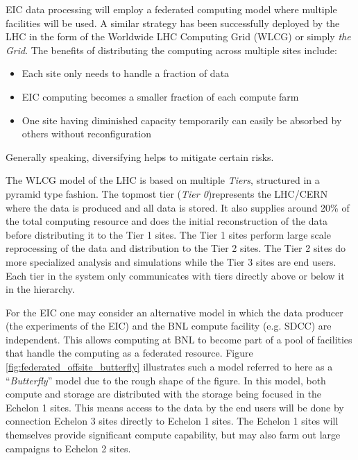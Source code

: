 EIC data processing will employ a federated computing model where multiple facilities will be used. A similar strategy has been successfully deployed by the LHC in the form of the Worldwide LHC Computing Grid (WLCG) or simply \emph{the Grid}\cite{SHIERS2007219}. The benefits of distributing the computing across multiple sites include:

\begin{itemize}
    \item Each site only needs to handle a fraction of data
    \item EIC computing becomes a smaller fraction of each compute farm
    \item One site having diminished capacity temporarily  can easily be absorbed by others without reconfiguration
\end{itemize}

Generally speaking, diversifying helps to mitigate certain risks. 

The WLCG model of the LHC is based on multiple \emph{Tiers}, structured in a pyramid type fashion. The topmost tier (\emph{Tier 0})represents the LHC/CERN where the data is produced and all data is stored. It also supplies around 20\% of the total computing resource and does the initial reconstruction of the data before distributing it to the Tier 1 sites\cite{WLCG_Tiers_website}. The Tier 1 sites perform large scale reprocessing of the data and distribution to the Tier 2 sites. The Tier 2 sites do more specialized analysis and simulations while the Tier 3 sites are end users. Each tier in the system only communicates with tiers directly above or below it in the hierarchy.

For the EIC one may consider an alternative model in which the data producer (the experiments of the EIC) and the BNL compute facility (e.g. SDCC) are independent. This allows computing at BNL to become part of a pool of facilities that handle the computing as a federated resource. Figure \ref{fig:federated_offsite_butterfly} illustrates such a model referred to here as a ``\emph{Butterfly}'' model due to the rough shape of the figure. In this model, both compute and storage are distributed with the storage being focused in the Echelon 1 sites. This means access to the data by the end users will be done by connection Echelon 3 sites directly to Echelon 1 sites. The Echelon 1 sites will themselves provide significant compute capability, but may also farm out large campaigns to Echelon 2 sites.


